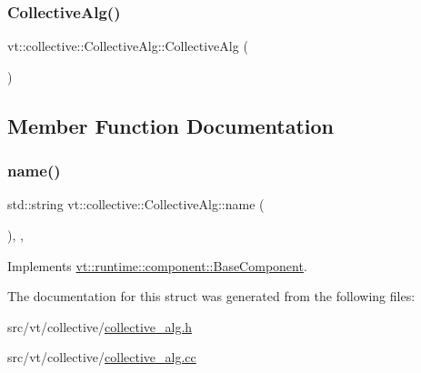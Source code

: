 \subsubsection{\texorpdfstring{Collective\+Alg()}{CollectiveAlg()}}
{\footnotesize\ttfamily vt\+::collective\+::\+Collective\+Alg\+::\+Collective\+Alg (\begin{DoxyParamCaption}{ }\end{DoxyParamCaption})}



\subsection{Member Function Documentation}
\mbox{\label{structvt_1_1collective_1_1_collective_alg_a81788afa34bc094c9f71fef8681aefb3}} 
\subsubsection{\texorpdfstring{name()}{name()}}
{\footnotesize\ttfamily std\+::string vt\+::collective\+::\+Collective\+Alg\+::name (\begin{DoxyParamCaption}{ }\end{DoxyParamCaption})\hspace{0.3cm}{\ttfamily [inline]}, {\ttfamily [override]}, {\ttfamily [virtual]}}



Implements \hyperlink{structvt_1_1runtime_1_1component_1_1_base_component_a7701485f3539f78d42e6bad47fc7eb78}{vt\+::runtime\+::component\+::\+Base\+Component}.



The documentation for this struct was generated from the following files\+:\begin{DoxyCompactItemize}
\item 
src/vt/collective/\hyperlink{collective__alg_8h}{collective\+\_\+alg.\+h}\item 
src/vt/collective/\hyperlink{collective__alg_8cc}{collective\+\_\+alg.\+cc}\end{DoxyCompactItemize}
